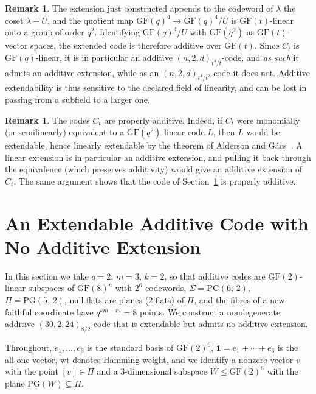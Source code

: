 \documentclass[12pt]{article}
\theoremstyle{definition}
\newtheorem{rem}[thm]{Remark}
\numberwithin{equation}{section}
\newcommand{\la}{\lambda}
\newcommand{\GF}[1]{\mathrm{GF}(#1)}
\newcommand{\PG}[2]{\mathrm{PG}(#1,\,#2)}
\newcommand{\PGv}[1]{\mathrm{PG}(#1)}
\newcommand{\wt}{\mathrm{wt}}
\newcommand{\onevec}{\mathbf{1}}
\begin{document}
\begin{rem}\label{rem:subfield}
The extension just constructed appends to the codeword of $\la$ the coset $\la+U$, and the quotient map $\GF{q}^4\to\GF{q}^4/U$ is $\GF{t}$-linear onto a group of order $q^2$.  Identifying $\GF{q}^4/U$ with $\GF{q^2}$ as $\GF{t}$-vector spaces, the extended code is therefore additive over $\GF{t}$.  Since $C_t$ is $\GF{q}$-linear, it is in particular an additive $(n,2,d)_{t^4/t}$-code, and \emph{as such} it admits an additive extension, while as an $(n,2,d)_{t^4/t^2}$-code it does not.  Additive extendability is thus sensitive to the declared field of linearity, and can be lost in passing from a subfield to a larger one.
\end{rem}

\begin{rem}\label{rem:properlyadd}
The codes $C_t$ are properly additive. Indeed, if $C_t$ were monomially (or semilinearly) equivalent to a $\GF{q^2}$-linear code $L$, then $L$ would be extendable, hence linearly extendable by the theorem of Alderson and G\'acs~\cite{MR2529622}. A linear extension is in particular an additive extension, and pulling it back through the equivalence (which preserves additivity) would give an additive extension of $C_t$.  The same argument shows that the code of Section~\ref{sec:counter} is properly additive.
\end{rem}



\section{An Extendable Additive Code with No Additive Extension}
\label{sec:counter}

In this section we take $q=2$, $m=3$, $k=2$, so that additive codes are $\GF2$-linear subspaces of $\GF8^n$ with $2^6$ codewords, $\Sigma=\PG62$, $\Pi=\PG52$, null flats are planes ($2$-flats) of $\Pi$, and the fibres of a new faithful coordinate have $q^{km-m}=8$ points.  We construct a nondegenerate additive $(30,2,24)_{8/2}$-code that is extendable but admits no additive extension.  


Throughout, $e_1,\ldots,e_6$ is the standard basis of $\GF2^6$, $\onevec=e_1+\cdots+e_6$ is the all-one vector, $\wt$ denotes Hamming weight, and we identify a nonzero vector $v$ with the point $[v]\in\Pi$ and a $3$-dimensional subspace $W\le\GF2^6$ with the plane $\PGv{W}\subseteq\Pi$.
\end{document}
